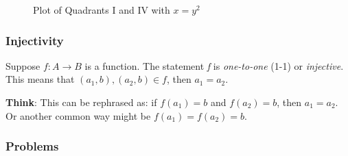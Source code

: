             \begin{figure}[h]
                \centering
                \caption{Plot of Quadrants I and IV with \(x = y^2\)}
            \end{figure}


            

        \subsubsection{Injectivity}
    
            \begin{definition}
                Suppose $f\colon A \rightarrow B$ is a function. The statement \textit{f} is \textit{one-to-one} (1-1) or \textit{injective}. This means that $(a_1,b), (a_2,b) \in f$, then $a_1 = a_2$.
            \end{definition}

            \textbf{Think}: This can be rephrased as: if $f(a_1) = b$ and $f(a_2) = b$, then $a_1 = a_2$. Or another common way might be $f(a_1) = f(a_2) = b$.

        \subsubsection{Problems}


